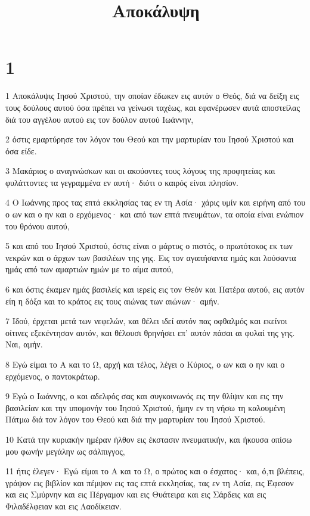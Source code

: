 

\title{Αποκάλυψη}


\chapter{1}

\par 1 Αποκάλυψις Ιησού Χριστού, την οποίαν έδωκεν εις αυτόν ο Θεός, διά να δείξη εις τους δούλους αυτού όσα πρέπει να γείνωσι ταχέως, και εφανέρωσεν αυτά αποστείλας διά του αγγέλου αυτού εις τον δούλον αυτού Ιωάννην,
\par 2 όστις εμαρτύρησε τον λόγον του Θεού και την μαρτυρίαν του Ιησού Χριστού και όσα είδε.
\par 3 Μακάριος ο αναγινώσκων και οι ακούοντες τους λόγους της προφητείας και φυλάττοντες τα γεγραμμένα εν αυτή· διότι ο καιρός είναι πλησίον.
\par 4 Ο Ιωάννης προς τας επτά εκκλησίας τας εν τη Ασία· χάρις υμίν και ειρήνη από του ο ων και ο ην και ο ερχόμενος· και από των επτά πνευμάτων, τα οποία είναι ενώπιον του θρόνου αυτού,
\par 5 και από του Ιησού Χριστού, όστις είναι ο μάρτυς ο πιστός, ο πρωτότοκος εκ των νεκρών και ο άρχων των βασιλέων της γης. Εις τον αγαπήσαντα ημάς και λούσαντα ημάς από των αμαρτιών ημών με το αίμα αυτού,
\par 6 και όστις έκαμεν ημάς βασιλείς και ιερείς εις τον Θεόν και Πατέρα αυτού, εις αυτόν είη η δόξα και το κράτος εις τους αιώνας των αιώνων· αμήν.
\par 7 Ιδού, έρχεται μετά των νεφελών, και θέλει ιδεί αυτόν πας οφθαλμός και εκείνοι οίτινες εξεκέντησαν αυτόν, και θέλουσι θρηνήσει επ' αυτόν πάσαι αι φυλαί της γης. Ναι, αμήν.
\par 8 Εγώ είμαι το Α και το Ω, αρχή και τέλος, λέγει ο Κύριος, ο ων και ο ην και ο ερχόμενος, ο παντοκράτωρ.
\par 9 Εγώ ο Ιωάννης, ο και αδελφός σας και συγκοινωνός εις την θλίψιν και εις την βασιλείαν και την υπομονήν του Ιησού Χριστού, ήμην εν τη νήσω τη καλουμένη Πάτμω διά τον λόγον του Θεού και διά την μαρτυρίαν του Ιησού Χριστού.
\par 10 Κατά την κυριακήν ημέραν ήλθον εις έκστασιν πνευματικήν, και ήκουσα οπίσω μου φωνήν μεγάλην ως σάλπιγγος,
\par 11 ήτις έλεγεν· Εγώ είμαι το Α και το Ω, ο πρώτος και ο έσχατος· και, ό,τι βλέπεις, γράψον εις βιβλίον και πέμψον εις τας επτά εκκλησίας, τας εν τη Ασία, εις Έφεσον και εις Σμύρνην και εις Πέργαμον και εις Θυάτειρα και εις Σάρδεις και εις Φιλαδέλφειαν και εις Λαοδίκειαν.
